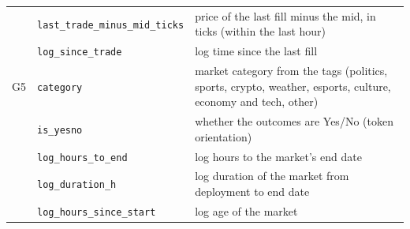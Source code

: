 \begin{footnotesize}
\begin{longtable}{llp{7.3cm}}
   & \texttt{last\_trade\_minus\_mid\_ticks} & price of the last fill minus the mid, in ticks (within the last hour) \\
   & \texttt{log\_since\_trade} & log time since the last fill \\
\midrule
G5 & \texttt{category} & market category from the tags (politics, sports, crypto, weather, esports, culture, economy and tech, other) \\
   & \texttt{is\_yesno} & whether the outcomes are Yes/No (token orientation) \\
   & \texttt{log\_hours\_to\_end} & log hours to the market's end date \\
   & \texttt{log\_duration\_h} & log duration of the market from deployment to end date \\
   & \texttt{log\_hours\_since\_start} & log age of the market \\
\end{longtable}
\end{footnotesize}
